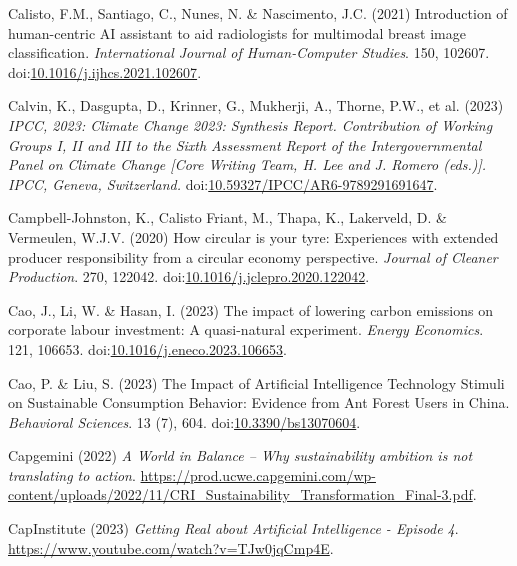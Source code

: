 \documentclass[
  letterpaper,
  DIV=11,
  numbers=noendperiod]{scrartcl}
\newlength{\cslhangindent}
\newenvironment{CSLReferences}[2] %
 {\begin{list}{}{%
  \setlength{\itemindent}{0pt}
  \setlength{\leftmargin}{0pt}
  \setlength{\parsep}{0pt}
  \ifodd #1
   \setlength{\leftmargin}{\cslhangindent}
   \setlength{\itemindent}{-1\cslhangindent}
  \fi
  \setlength{\itemsep}{#2\baselineskip}}}
 {\end{list}}
\begin{document}
\begin{CSLReferences}{0}{1}
Calisto, F.M., Santiago, C., Nunes, N. \& Nascimento, J.C. (2021)
Introduction of human-centric {AI} assistant to aid radiologists for
multimodal breast image classification. \emph{International Journal of
Human-Computer Studies}. 150, 102607.
doi:\href{https://doi.org/10.1016/j.ijhcs.2021.102607}{10.1016/j.ijhcs.2021.102607}.

Calvin, K., Dasgupta, D., Krinner, G., Mukherji, A., Thorne, P.W., et
al. (2023) \emph{{IPCC}, 2023: {Climate Change} 2023: {Synthesis
Report}. {Contribution} of {Working Groups I}, {II} and {III} to the
{Sixth Assessment Report} of the {Intergovernmental Panel} on {Climate
Change} {[}{Core Writing Team}, {H}. {Lee} and {J}. {Romero} (eds.){]}.
{IPCC}, {Geneva}, {Switzerland}.}
doi:\href{https://doi.org/10.59327/IPCC/AR6-9789291691647}{10.59327/IPCC/AR6-9789291691647}.

Campbell-Johnston, K., Calisto Friant, M., Thapa, K., Lakerveld, D. \&
Vermeulen, W.J.V. (2020) How circular is your tyre: {Experiences} with
extended producer responsibility from a circular economy perspective.
\emph{Journal of Cleaner Production}. 270, 122042.
doi:\href{https://doi.org/10.1016/j.jclepro.2020.122042}{10.1016/j.jclepro.2020.122042}.

Cao, J., Li, W. \& Hasan, I. (2023) The impact of lowering carbon
emissions on corporate labour investment: {A} quasi-natural experiment.
\emph{Energy Economics}. 121, 106653.
doi:\href{https://doi.org/10.1016/j.eneco.2023.106653}{10.1016/j.eneco.2023.106653}.

Cao, P. \& Liu, S. (2023) The {Impact} of {Artificial Intelligence
Technology Stimuli} on {Sustainable Consumption Behavior}: {Evidence}
from {Ant Forest Users} in {China}. \emph{Behavioral Sciences}. 13 (7),
604. doi:\href{https://doi.org/10.3390/bs13070604}{10.3390/bs13070604}.

Capgemini (2022) \emph{A {World} in {Balance} -- {Why} sustainability
ambition is not translating to action}.
\url{https://prod.ucwe.capgemini.com/wp-content/uploads/2022/11/CRI_Sustainability_Transformation_Final-3.pdf}.

CapInstitute (2023) \emph{Getting {Real} about {Artificial Intelligence}
- {Episode} 4}. \url{https://www.youtube.com/watch?v=TJw0jqCmp4E}.


\end{CSLReferences}
\end{document}
